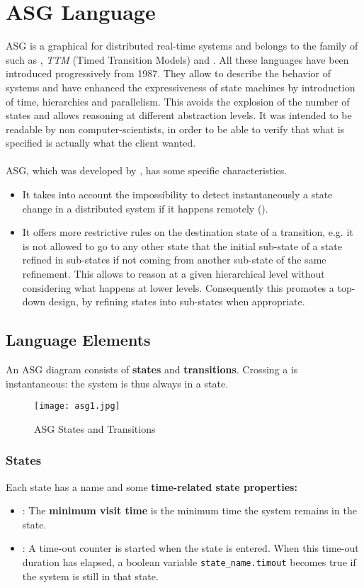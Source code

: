 \documentclass[../main.tex]{subfiles}
\begin{document}
\chapter{ASG Language}
ASG is a graphical  for distributed real-time systems and belongs to the family of  such as \textit{}, \textit{TTM} (Timed Transition Models) and \textit{}.
All these languages have been introduced progressively from 1987.
They allow to describe the behavior of systems and have enhanced the expressiveness of state machines by introduction of time, hierarchies and parallelism.
This avoids the explosion of the number of states and allows reasoning at different abstraction levels.
It was intended to be readable by non computer-scientists, in order to be able to verify that what is specified is actually what the client wanted.
\\\\
ASG, which was developed by , has some specific characteristics.
\begin{itemize}
	\item It takes into account the impossibility to detect instantaneously a state change in a distributed system if it happens remotely ().
	\item It offers more restrictive rules on the destination state of a transition, e.g. it is not allowed to go to any other state that the initial sub-state of a state refined in sub-states if not coming from another sub-state of the same refinement.
    This allows to reason at a given hierarchical level without considering what happens at lower levels.
    Consequently this promotes a top-down design, by refining states into sub-states when appropriate.
\end{itemize}

\section{Language Elements}
An ASG diagram consists of \textbf{states} and \textbf{transitions}. Crossing a  is instantaneous: the system is thus always in a state.
\begin{figure}[H]
    \centering
    \texttt{[image: asg1.jpg]}
    \caption{ASG States and Transitions}
    \label{asg1}
\end{figure}

\subsection{States}
Each state has a name and some \textbf{time-related state properties:}
\begin{itemize}
	\item {}: The \textbf{minimum visit time} is the minimum time the system remains in the state.
	\item {}: A time-out counter is started when the state is entered. When this time-out duration has elapsed, a boolean variable \texttt{state\_name.timout} becomes true if the system is still in that state.
\end{itemize}
\end{document}
